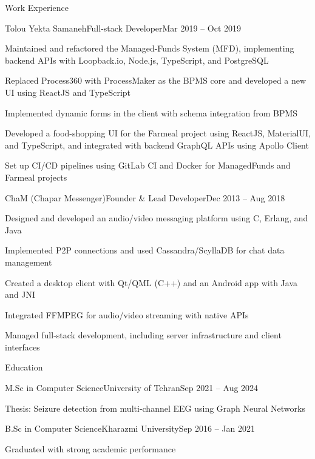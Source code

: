 \documentclass[]{main}
\begin{document}
\begin{section}{Work Experience}
 \begin{subsection}{Tolou Yekta Samaneh}{Full-stack Developer}{Mar 2019 -- Oct 2019}{}
     \item Maintained and refactored the Managed-Funds System (MFD), implementing backend APIs with Loopback.io, Node.js, TypeScript, and PostgreSQL
     \item Replaced Process360 with ProcessMaker as the BPMS core and developed a new UI using ReactJS and TypeScript
     \item Implemented dynamic forms in the client with schema integration from BPMS
     \item Developed a food-shopping UI for the Farmeal project using ReactJS, MaterialUI, and TypeScript, and integrated with backend GraphQL APIs using Apollo Client
     \item Set up CI/CD pipelines using GitLab CI and Docker for ManagedFunds and Farmeal projects
 \end{subsection}

 \begin{subsection}{ChaM (Chapar Messenger)}{Founder \& Lead Developer}{Dec 2013 -- Aug 2018}{}
     \item Designed and developed an audio/video messaging platform using C, Erlang, and Java
     \item Implemented P2P connections and used Cassandra/ScyllaDB for chat data management
     \item Created a desktop client with Qt/QML (C++) and an Android app with Java and JNI
     \item Integrated FFMPEG for audio/video streaming with native APIs
     \item Managed full-stack development, including server infrastructure and client interfaces
 \end{subsection}
\end{section}

\begin{section}{Education}
 \begin{subsectionnobullet}{M.Sc in Computer Science}{University of Tehran}{Sep 2021 -- Aug 2024}{}
     \item Thesis: Seizure detection from multi-channel EEG using Graph Neural Networks
 \end{subsectionnobullet}
 \begin{subsectionnobullet}{B.Sc in Computer Science}{Kharazmi University}{Sep 2016 -- Jan 2021}{}
     \item Graduated with strong academic performance
 \end{subsectionnobullet}
\end{section}
\end{document}
